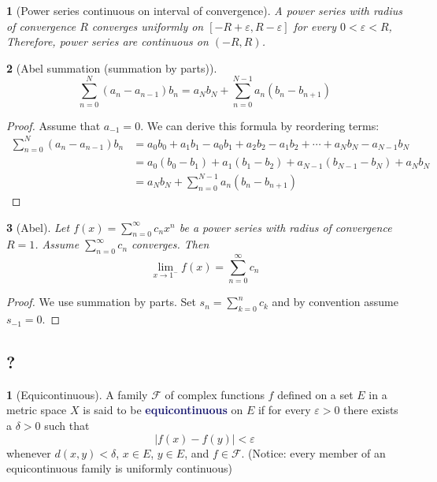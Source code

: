 \documentclass[12pt]{article}
\numberwithin{equation}{section}
\newcommand{\navy}[1]{\textcolor{MidnightBlue}{\bf #1}}
\theoremstyle{plain}
\newtheorem{theorem}{\color{ForestGreen}{\textbf{Theorem}}}[section]
\theoremstyle{definition}
\newtheorem{definition}{\color{MidnightBlue}{\textbf{Definition}}}[section]
\newcommand{\1}{\mathbbm 1}
\def\d{\delta}
\newcommand{\e}{\varepsilon}
\newcommand{\fF}{\mathscr F}
\begin{document}
\begin{theorem}[Power series continuous on interval of convergence]
	A power series with radius of convergence $R$ converges uniformly on $[-R + \e, R- \e]$ for every $0 < \e < R$, Therefore, power series are continuous on $(-R,R)$.
\end{theorem}

\begin{theorem}[Abel summation (summation by parts)]
	\begin{equation}
		\sum_{n=0}^N (a_n - a_{n-1})b_n = a_Nb_N + \sum_{n=0}^{N-1}a_n(b_n - b_{n+1})
	\end{equation}
\end{theorem}
\begin{proof}
	Assume that $a_{-1} = 0$. We can derive this formula by reordering terms:
	\begin{align*}
		\sum_{n=0}^N (a_n - a_{n-1})b_n &= a_0b_0 + a_1b_1 - a_0b_1 + a_2b_2 - a_1b_2 + \cdots + a_{N}b_N - a_{N-1}b_N \\
		&= a_0(b_0 - b_1) + a_1(b_1 - b_2) + a_{N-1}(b_{N-1} - b_N) + a_N b_N \\
		&= a_Nb_N + \sum_{n=0}^{N-1}a_n(b_n - b_{n+1})
	\end{align*}
	
\end{proof}

\begin{theorem}[Abel]
	Let $f(x) = \sum_{n=0}^\infty c_n x^n$ be a power series with radius of convergence $R=1$. Assume $\sum_{n=0}^\infty c_n$ converges. Then 
	\begin{equation}
		\lim_{x \to 1^-} f(x) = \sum_{n=0}^\infty c_n
	\end{equation}
\end{theorem}
\begin{proof}
	We use summation by parts. Set $s_n = \sum_{k=0}^n c_k$ and by convention assume $s_{-1} = 0$. 
\end{proof}



\subsection{?}

\begin{definition}[Equicontinuous]
	A family $\fF$ of complex functions $f$ defined on a set $E$ in a metric space $X$ is said to be \navy{equicontinuous} on $E$ if for every $\e > 0$ there exists a $\d > 0$ such that
	\begin{equation*}
		|f(x) - f(y)| < \e
	\end{equation*}
	whenever $d(x,y) < \d$, $x \in E$, $y \in E$, and $f \in \fF$. (Notice: every member of an equicontinuous family is uniformly continuous)
\end{definition}
\end{document}
